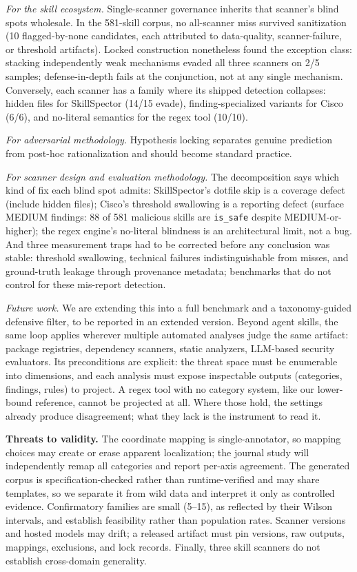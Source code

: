 \documentclass[sigconf,nonacm]{acmart}
\begin{document}
\emph{For the skill ecosystem.} Single-scanner governance inherits that scanner's blind spots wholesale. In the 581-skill corpus, no all-scanner miss survived sanitization (10 flagged-by-none candidates, each attributed to data-quality, scanner-failure, or threshold artifacts). Locked construction nonetheless found the exception class: stacking independently weak mechanisms evaded all three scanners on 2/5 samples; defense-in-depth fails at the conjunction, not at any single mechanism. Conversely, each scanner has a family where its shipped detection collapses: hidden files for SkillSpector (14/15 evade), finding-specialized variants for Cisco (6/6), and no-literal semantics for the regex tool (10/10).

\emph{For adversarial methodology.} Hypothesis locking separates genuine prediction from post-hoc rationalization and should become standard practice.

\emph{For scanner design and evaluation methodology.} The decomposition says which kind of fix each blind spot admits: SkillSpector's dotfile skip is a coverage defect (include hidden files); Cisco's threshold swallowing is a reporting defect (surface MEDIUM findings: 88 of 581 malicious skills are \texttt{is\_safe} despite MEDIUM-or-higher); the regex engine's no-literal blindness is an architectural limit, not a bug. And three measurement traps had to be corrected before any conclusion was stable: threshold swallowing, technical failures indistinguishable from misses, and ground-truth leakage through provenance metadata; benchmarks that do not control for these mis-report detection.

\emph{Future work.} We are extending this into a full benchmark and a taxonomy-guided defensive filter, to be reported in an extended version. Beyond agent skills, the same loop applies wherever multiple automated analyses judge the same artifact: package registries, dependency scanners, static analyzers, LLM-based security evaluators. Its preconditions are explicit: the threat space must be enumerable into dimensions, and each analysis must expose inspectable outputs (categories, findings, rules) to project. A regex tool with no category system, like our lower-bound reference, cannot be projected at all. Where those hold, the settings already produce disagreement; what they lack is the instrument to read it.

\noindent\textbf{Threats to validity.} The coordinate mapping is single-annotator, so mapping choices may create or erase apparent localization; the journal study will independently remap all categories and report per-axis agreement. The generated corpus is specification-checked rather than runtime-verified and may share templates, so we separate it from wild data and interpret it only as controlled evidence. Confirmatory families are small (5--15), as reflected by their Wilson intervals, and establish feasibility rather than population rates. Scanner versions and hosted models may drift; a released artifact must pin versions, raw outputs, mappings, exclusions, and lock records. Finally, three skill scanners do not establish cross-domain generality.
\end{document}
